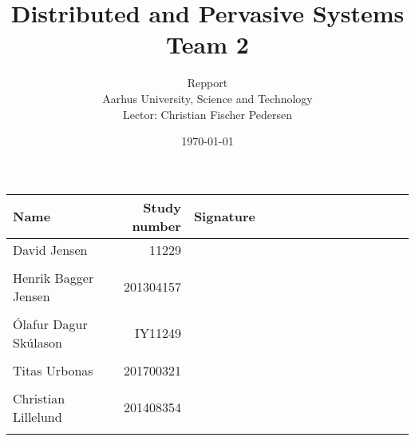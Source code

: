 \documentclass[a4paper,11pt,twoside,openright]{memoir}
\title{Distributed and Pervasive Systems \\ Team 2}
\author{Repport \\ Aarhus University, Science and Technology \\ Lector: Christian Fischer Pedersen}
\date{\today}
\begin{document}
\fancyhf{} %
\frontmatter
\maketitle
\vfill


\begin{table} [h]
	\centering
	\begin{tabular}{|l|r|l|}
	\hline 
	\textbf{Name} 				& \textbf{Study number} & \textbf{Signature~~~~~~~~~~~~~~~~~~~~} 	\\ \hline
	David Jensen 				& 11229 	& \\ && 												\\ \hline
	Henrik Bagger Jensen 		& 201304157 & \\ && 												\\ \hline
	Ólafur Dagur Skúlason 		& IY11249	& \\ && 												\\ \hline
	Titas Urbonas 				& 201700321 & \\ && 												\\ \hline
	Christian Lillelund 		& 201408354 & \\ && 												\\ \hline

	\end{tabular}
\end{table}

\clearpage
\pagestyle{plain}

\tableofcontents

\vfill

\mainmatter
\pagestyle{fancy}
\fancyhf{} %
\fancyhead[CE,CO]{\nouppercase{\leftmark}}
\fancyfoot[CO,CE]{\nouppercase{\rightmark}}
\fancyfoot[LE,RO]{\thepage}

				\cleartorightpage
	\cleartorightpage
		\cleartorightpage
		\cleartorightpage
					\cleartorightpage
				\cleartorightpage
			\cleartorightpage
			\cleartorightpage
				\cleartorightpage
				    \cleartorightpage
				    \cleartorightpage
				\cleartorightpage
				\cleartorightpage

\end{document}
